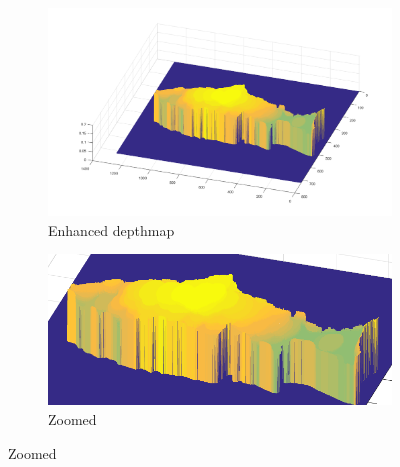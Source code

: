 \begin{figure}[H]
    \medskip
    \begin{subfigure}{0.41\textwidth}
        \includegraphics[width=\linewidth]{images/results/3D_plots/fixed_3D_87}
        \caption{Enhanced depthmap}
    \end{subfigure}\hspace*{\fill}
    \begin{subfigure}{0.57\textwidth}
        \includegraphics[width=\linewidth]{images/results/3D_plots/zoomed_fixed_3D_87}
        \caption{Zoomed}
    \end{subfigure}
    

\end{figure}
